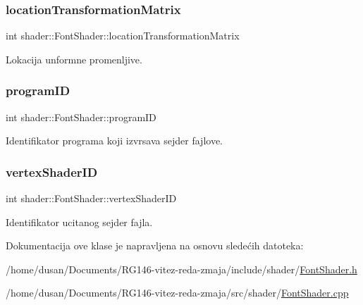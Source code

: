\subsubsection{\texorpdfstring{location\+Transformation\+Matrix}{locationTransformationMatrix}}
{\footnotesize\ttfamily int shader\+::\+Font\+Shader\+::location\+Transformation\+Matrix\hspace{0.3cm}{\ttfamily [private]}}



Lokacija unformne promenljive. 

\mbox{\label{classshader_1_1FontShader_a5836d121dcb745fc151a76416ed82287}} 
\subsubsection{\texorpdfstring{program\+ID}{programID}}
{\footnotesize\ttfamily int shader\+::\+Font\+Shader\+::program\+ID\hspace{0.3cm}{\ttfamily [private]}}



Identifikator programa koji izvrsava sejder fajlove. 

\mbox{\label{classshader_1_1FontShader_aa685de6b436e9d1a0bd0904e673ac035}} 
\subsubsection{\texorpdfstring{vertex\+Shader\+ID}{vertexShaderID}}
{\footnotesize\ttfamily int shader\+::\+Font\+Shader\+::vertex\+Shader\+ID\hspace{0.3cm}{\ttfamily [private]}}



Identifikator ucitanog sejder fajla. 



Dokumentacija ove klase je napravljena na osnovu sledećih datoteka\+:\begin{DoxyCompactItemize}
\item 
/home/dusan/\+Documents/\+R\+G146-\/vitez-\/reda-\/zmaja/include/shader/\hyperlink{FontShader_8h}{Font\+Shader.\+h}\item 
/home/dusan/\+Documents/\+R\+G146-\/vitez-\/reda-\/zmaja/src/shader/\hyperlink{FontShader_8cpp}{Font\+Shader.\+cpp}\end{DoxyCompactItemize}
